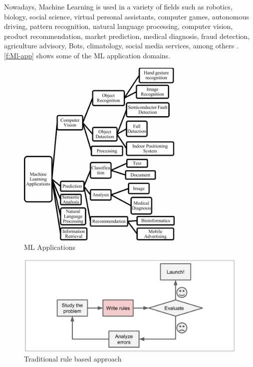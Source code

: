 Nowadays, Machine Learning is used in a variety of fields such as robotics, biology, social science, virtual personal assistants, computer games, autonomous driving, pattern recognition, natural language processing, computer vision, product recommendation, market prediction, medical diagnosis, fraud detection, agriculture advisory, Bots, climatology, social media services, among others \cite{Srivastava_2019, Shinde_2018, Ray2019}. \autoref{f:Ml-app} shows some of the \ac{ML} application domains. 

\begin{figure}[t]
\centering
\includegraphics[width=8cm]{figures/Ch2/ML-Applications.png}
\caption{ML Applications \cite{Shinde_2018}}
\label{f:Ml-app}
\end{figure}

\begin{figure}[h]
\centering
\includegraphics[width=14cm]{figures/Ch2/Tradicional-Approach.png}
\caption{Traditional rule based approach \cite{geron2017}}
\label{f:Traditional-approach}
\end{figure}

